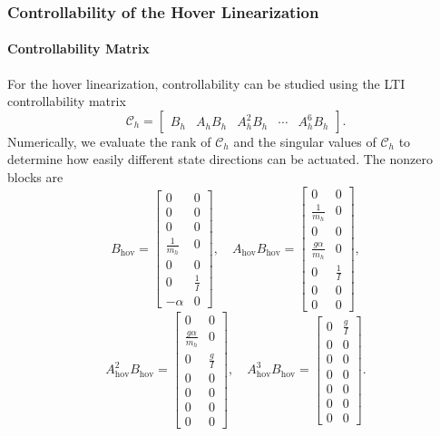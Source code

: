 \subsubsection{Controllability of the Hover Linearization}
\label{subsec:hover_controllability}
\paragraph{Controllability Matrix}
For the hover linearization, controllability can be studied using the LTI controllability matrix
\[
    \mathcal{C}_h
    =
    \begin{bmatrix}
        B_h & A_hB_h & A_h^2B_h & \cdots & A_h^{6}B_h
    \end{bmatrix}.
\]
Numerically, we evaluate the rank of $\mathcal{C}_h$ and the singular values of $\mathcal{C}_h$ to determine how easily different state directions can be actuated.
The nonzero blocks are
{\small
\[
B_{\mathrm{hov}}=
\begin{bmatrix}
0&0\\0&0\\0&0\\\frac{1}{m_h}&0\\0&0\\0&\frac{1}{I}\\-\alpha&0
\end{bmatrix},
\quad
A_{\mathrm{hov}}B_{\mathrm{hov}}=
\begin{bmatrix}
0&0\\\frac{1}{m_h}&0\\0&0\\\frac{g\alpha}{m_h}&0\\0&\frac{1}{I}\\0&0\\0&0
\end{bmatrix},
\]
\[
A_{\mathrm{hov}}^2B_{\mathrm{hov}}=
\begin{bmatrix}
0&0\\\frac{g\alpha}{m_h}&0\\0&\frac{g}{I}\\0&0\\0&0\\0&0\\0&0
\end{bmatrix},
\quad
A_{\mathrm{hov}}^3B_{\mathrm{hov}}=
\begin{bmatrix}
0&\frac{g}{I}\\0&0\\0&0\\0&0\\0&0\\0&0\\0&0
\end{bmatrix}.
\]
}

